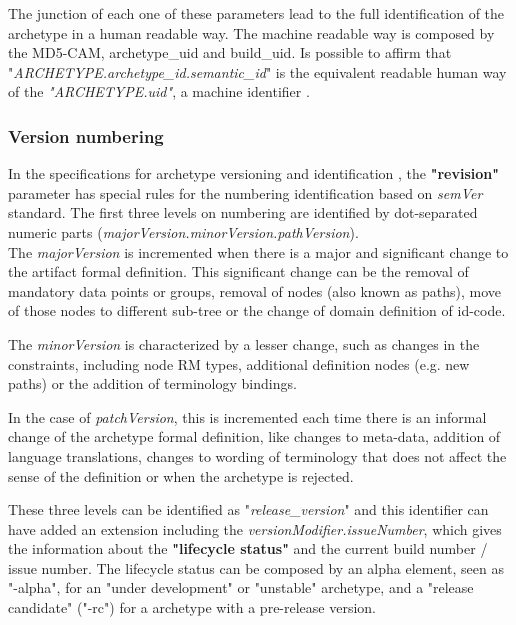 \documentclass[mim_thesis.tex]{subfiles}
\begin{document}
The junction of each one of these parameters lead to the full identification of the archetype in a human readable way. The machine readable way is composed by the MD5-CAM, archetype\_uid and build\_uid. Is possible to affirm that "\textit{ARCHETYPE.archetype\_id.semantic\_id}" is the equivalent readable human way of the \textit{"ARCHETYPE.uid"}, a machine identifier \citep{openEHRarchver}.

\newpage
\subsubsection{Version numbering}

In the specifications for archetype versioning and identification \citep{openEHRarchver}, the \textbf{"revision"} parameter has special rules for the numbering identification based on \textit{semVer} standard. The first three levels on numbering are identified by dot-separated numeric parts (\textit{majorVersion.minorVersion.pathVersion}). \\

The \textit{majorVersion} is incremented when there is a major and significant change to the artifact formal definition. This significant change can be the removal of mandatory data points or groups, removal of nodes (also known as paths), move of those nodes to different sub-tree or the change of domain definition of id-code. 

The \textit{minorVersion} is characterized by a lesser change, such as changes in the constraints, including node RM types, additional definition nodes (e.g. new paths) or the addition of terminology bindings. 

In the case of \textit{patchVersion}, this is incremented each time there is an informal change of the archetype formal definition, like changes to meta-data, addition of language translations, changes to wording of terminology that does not affect the sense of the definition or when the archetype is rejected. \citep{openEHRAOM_AIS} 

These three levels can be identified as "\textit{release\_version}" and this identifier can have added an extension including the \textit{versionModifier.issueNumber}, which gives the information about the \textbf{"lifecycle status"} and the current build number / issue number. The lifecycle status can be composed by an alpha element, seen as "-alpha", for an "under development" or "unstable" archetype, and a "release candidate" ("-rc") for a archetype with a pre-release version. \\
\end{document}
